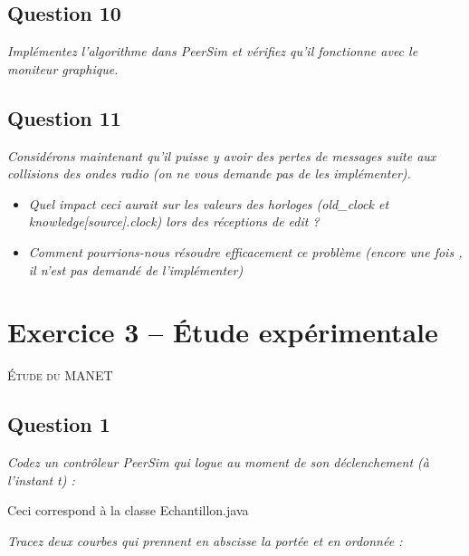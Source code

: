 \documentclass[11pt,a4paper,sans]{report}
\begin{document}
	\section{Question 10}
	\textit{Implémentez l’algorithme dans PeerSim et vérifiez qu’il fonctionne avec le moniteur graphique.}
	\section{Question 11}
	\textit{Considérons maintenant qu’il puisse y avoir des pertes de messages suite aux collisions des ondes radio (on ne vous demande pas de les implémenter).}
	\begin{itemize}
		\item \textit{Quel impact ceci aurait sur les valeurs des horloges (old\_clock et knowledge[source].clock) lors des réceptions de edit ?}
		\item \textit{Comment pourrions-nous résoudre efficacement ce problème (encore une fois , il n’est pas demandé de l’implémenter)}
	\end{itemize}

	\newpage
	\chapter{Exercice 3 – Étude expérimentale}
	\begin{center}
		\textsc{\large Étude du MANET}
	\end{center}
	\section{Question 1}
	\textit{Codez un contrôleur PeerSim qui logue au moment de son déclenchement (à l’instant
		t) :}
	\par Ceci correspond à la classe Echantillon.java

	\textit{Tracez deux courbes qui prennent en abscisse la portée et en ordonnée :}
\end{document}
